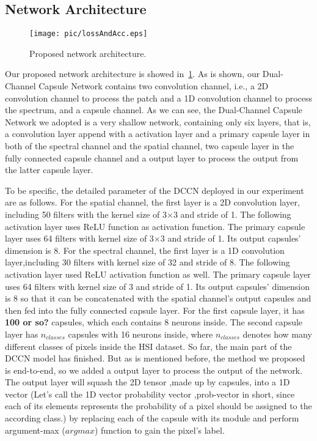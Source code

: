 \documentclass{article}
\begin{document}
	\subsection{Network Architecture}\label{subsec:network-architecture}
	\begin{figure}[!ht]
		\centering
		\texttt{[image: pic/lossAndAcc.eps]}
		\caption{Proposed network architecture.}
		\label{netArct}
	\end{figure}
	Our proposed network architecture is showed in~\ref{netArct}.
	As is shown, our Dual-Channel Capsule Network contains two convolution channel, i.e., a 2D convolution channel to
	process the patch and a 1D convolution channel to process the spectrum, and a capsule channel.
	As we can see, the Dual-Channel Capsule Network we adopted is a very shallow network, containing only six layers,
	that is, a convolution layer append with a activation layer and a primary capsule layer in both of the spectral
	channel and the spatial channel, two capsule layer in the fully connected capsule channel and a output layer to
	process the output from the latter capsule layer.

	To be specific, the detailed parameter of the DCCN deployed in our experiment are as follows.
	For the spatial channel, the first layer is a 2D convolution layer, including 50 filters with the kernel size of
	3×3 and stride of 1.
	The following activation layer uses ReLU function as activation function.
	The primary capsule layer uses 64 filters with kernel size of 3×3 and stride of 1.
	Its output capsules' dimension is 8.
	For the spectral channel, the first layer is a 1D convolution layer,including 30 filters with kernel size of 32 and
	stride of 8.
	The following activation layer used ReLU activation function as well.
	The primary capsule layer uses 64 filters with kernel size of 3 and stride of 1.
	Its output capsules' dimension is 8 so that it can be concatenated with the spatial channel's output capsules and
	then fed into the fully connected capsule layer.
	For the first capsule layer, it has \textbf{100 or so?} capsules, which each contains 8 neurons inside.
	The second capsule layer has $n_{classes}$ capsules with 16 neurons inside, where $n_{classes}$ denotes how many
	different classes of pixels inside the HSI dataset.
	So far, the main part of the DCCN model has finished.
	But as is mentioned before, the method we proposed is end-to-end, so we added a output layer to process the output
	of the network.
	The output layer will squash the 2D tensor ,made up by capsules, into a 1D vector (Let's call the 1D vector
	probability vector ,prob-vector in short, since each of its elements represents the probability of a pixel should
	be assigned to the according class.) by replacing each of the capsule with its module and perform argument-max
	($argmax$) function to gain the pixel's label.
\end{document}
